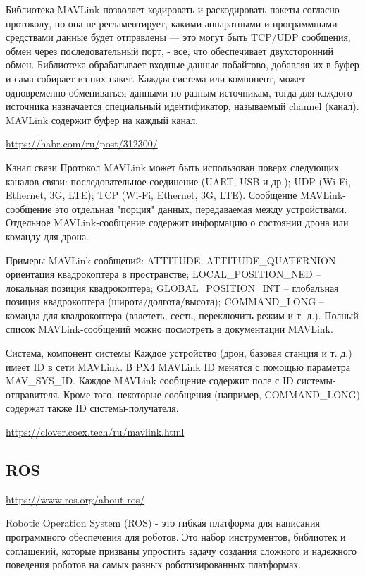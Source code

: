 Библиотека MAVLink позволяет кодировать и раскодировать пакеты согласно протоколу, но она не регламентирует, какими аппаратными и программными средствами данные будет отправлены — это могут быть TCP/UDP сообщения, обмен через последовательный порт, - все, что обеспечивает двухсторонний обмен. Библиотека обрабатывает входные данные побайтово, добавляя их в буфер и сама собирает из них пакет. Каждая система или компонент, может одновременно обмениваться данными по разным источникам, тогда для каждого источника назначается специальный идентификатор, называемый channel (канал). MAVLink содержит буфер на каждый канал.

\url{https://habr.com/ru/post/312300/}

Канал связи
Протокол MAVLink может быть использован поверх следующих каналов связи:
последовательное соединение (UART, USB и др.);
UDP (Wi-Fi, Ethernet, 3G, LTE);
TCP (Wi-Fi, Ethernet, 3G, LTE).
Сообщение
MAVLink-сообщение это отдельная "порция" данных, передаваемая между устройствами. Отдельное MAVLink-сообщение содержит информацию о состоянии дрона или команду для дрона.

Примеры MAVLink-сообщений:
ATTITUDE, ATTITUDE\_QUATERNION – ориентация квадрокоптера в пространстве;
LOCAL\_POSITION\_NED – локальная позиция квадрокоптера;
GLOBAL\_POSITION\_INT – глобальная позиция квадрокоптера (широта/долгота/высота);
COMMAND\_LONG – команда для квадрокоптера (взлететь, сесть, переключить режим и т. д.).
Полный список MAVLink-сообщений можно посмотреть в документации MAVLink.

Система, компонент системы
Каждое устройство (дрон, базовая станция и т. д.) имеет ID в сети MAVLink. В PX4 MAVLink ID менятся с помощью параметра MAV\_SYS\_ID. Каждое MAVLink сообщение содержит поле с ID системы-отправителя. Кроме того, некоторые сообщения (например, COMMAND\_LONG) содержат также ID системы-получателя.

\url{https://clover.coex.tech/ru/mavlink.html}

\subsection{ROS}

\url{https://www.ros.org/about-ros/}

Robotic Operation System (ROS) - это гибкая платформа для написания программного обеспечения для роботов. Это набор инструментов, библиотек и соглашений, которые призваны упростить задачу создания сложного и надежного поведения роботов на самых разных роботизированных платформах.

